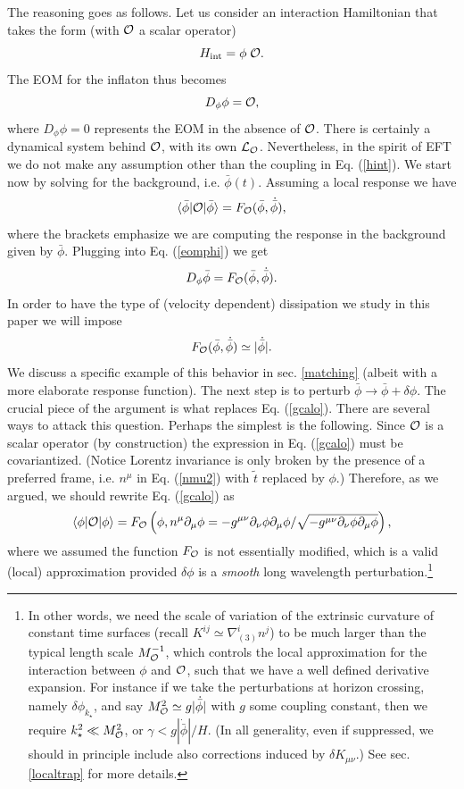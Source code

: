 \documentclass[11pt,amsmath,floats,floatfix,nofootinbib,secnumarabic, superscriptaddress, tightenlines]{revtex4}
\newcommand{\beq}{\begin{equation}}
\newcommand{\eeq}{\end{equation}}
\newcommand{\calo}{{\cal O}}
\newcommand{\calL}{{\cal L}}
\newcommand{\bphi}{{\bar\phi}}
\begin{document}
{The reasoning goes as follows. Let us consider an interaction Hamiltonian that takes the form (with $\calo$ a scalar operator)
\beq
H_{\rm int} = \phi\; \calo \label{hint}.
\eeq
The EOM for the inflaton thus becomes
\beq
\label{eomphi}
D_\phi \phi = \calo,
\eeq
where $D_\phi \phi=0$ represents the EOM in the absence of $\calo$. There is certainly a dynamical system behind $\calo$, with its own $\calL_\calo$. Nevertheless, in the spirit of EFT we do not make any assumption other than the coupling in Eq. (\ref{hint}). We start now by solving for the background, i.e. $\bphi(t)$.  Assuming a local response we have
\beq
\label{gcalo}
\langle \bphi|\calo |\bphi\rangle = F_\calo(\bphi, \dot{\bphi}),
\eeq
where the brackets emphasize we are computing the response in the background given by $\bphi$. Plugging into Eq. (\ref{eomphi}) we get
\beq
\label{dphibpi}
D_\phi \bphi = F_\calo(\bphi, \dot{\bphi}).
\eeq
In order to have the type of (velocity dependent) dissipation we study in this paper we will impose
\beq
\label{fphip}
 F_\calo(\bphi, \dot{\bphi})\simeq |\dot\bphi|.
\eeq
We discuss a specific example of this behavior in sec. \ref{matching} (albeit with a more elaborate response function). The next step is to perturb $\bphi \to \bphi +\delta\phi$. The crucial piece of the argument is what replaces Eq. (\ref{gcalo}). There are several ways to attack this question. Perhaps the simplest is the following. Since $\calo$ is a scalar operator (by construction) the expression in Eq. (\ref{gcalo}) must be covariantized. (Notice Lorentz invariance is only broken by the presence of a preferred frame, i.e. $n^\mu$ in Eq. (\ref{nmu2}) with $\tilde t$ replaced by $\phi$.) Therefore, as we argued, we should rewrite Eq. (\ref{gcalo}) as
\beq
\label{gcalo2}
\langle \phi|\calo |\phi\rangle = F_\calo\left(\phi, n^\mu \partial_\mu \phi = -g^{\mu\nu}\partial_\nu\phi\partial_\mu\phi/\sqrt{-g^{\mu\nu}\partial_\nu\phi\partial_\mu\phi}\right),
\eeq
where we assumed the function $F_\calo$ is not essentially modified, which is a valid (local) approximation provided $\delta\phi$ is a {\it smooth} long wavelength perturbation.\footnote{In other words, we need the scale of variation of the extrinsic curvature of constant time surfaces (recall $K^{ij} \simeq \nabla^i_{(3)} n^j$) to be much larger
than the typical length scale $M^{-1}_\calo$, which controls the local approximation for the interaction between $\phi$ and $\calo$, such that we have a well defined derivative expansion. For instance if we take the perturbations at horizon crossing, namely $\delta\phi_{k_\star}$, and say $M^2_\calo \simeq g |\dot\bphi|$ with $g$ some coupling constant, then we require $k_\star^2 \ll M_\calo^2$, or $\gamma < g |\dot\bphi|/H$. (In all generality, even if suppressed, we should in principle include also corrections induced by $\delta K_{\mu\nu}$.) See sec. \ref{localtrap} for more details.}

}
\end{document}
